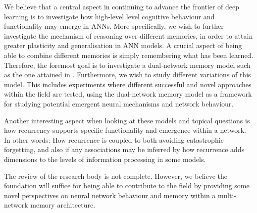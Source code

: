 We believe that a central aspect in continuing to advance the frontier of deep learning is to investigate how high-level level cognitive behaviour and functionality may emerge in ANNs. More specifically, we wish to further investigate the mechanism of reasoning over different memories, in order to attain greater plasticity and generalisation in ANN models. A crucial aspect of being able to combine different memories is simply remembering what has been learned. Therefore, the foremost goal is to investigate a dual-network memory model such as the one attained in \cite{Hattori2014}. Furthermore, we wish to study different variations of this model. This includes experiments where different successful and novel approaches within the field are tested, using the dual-network memory model as a framework for studying potential emergent neural mechanisms and network behaviour.

Another interesting aspect when looking at these models and topical questions is how recurrency supports specific functionality and emergence within a network. In other words: How recurrence is coupled to both avoiding catastrophic forgetting, and also if any associations may be inferred by how recurrence adds dimensions to the levels of information processing in some models.

The review of the research body is not complete. However, we believe the foundation will suffice for being able to contribute to the field by providing some novel perspectives on neural network behaviour and memory within a multi-network memory architecture.

\cleardoublepage
